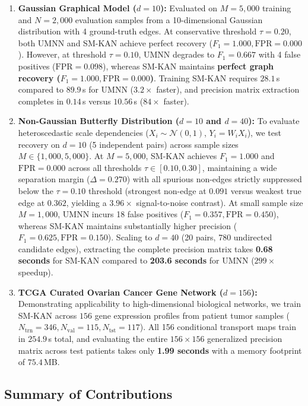 \documentclass[11pt,a4paper]{article}
\theoremstyle{plain}
\theoremstyle{definition}
\theoremstyle{remark}
\begin{document}
\begin{enumerate}
    \item \textbf{Gaussian Graphical Model ($d=10$):} Evaluated on $M=5{,}000$ training and $N=2{,}000$ evaluation samples from a 10-dimensional Gaussian distribution with 4 ground-truth edges. At conservative threshold $\tau = 0.20$, both UMNN and SM-KAN achieve perfect recovery ($F_1 = 1.000, \text{FPR} = 0.000$). However, at threshold $\tau = 0.10$, UMNN degrades to $F_1 = 0.667$ with 4 false positives ($\text{FPR} = 0.098$), whereas SM-KAN maintains \textbf{perfect graph recovery ($F_1 = 1.000, \text{FPR} = 0.000$)}. Training SM-KAN requires $28.1$\,s compared to $89.9$\,s for UMNN ($3.2\times$ faster), and precision matrix extraction completes in $0.14$\,s versus $10.56$\,s ($84\times$ faster).

    \item \textbf{Non-Gaussian Butterfly Distribution ($d=10$ and $d=40$):} To evaluate heteroscedastic scale dependencies ($X_i \sim \mathcal{N}(0, 1)$, $Y_i = W_i X_i$), we test recovery on $d=10$ (5 independent pairs) across sample sizes $M \in \{1{,}000, 5{,}000\}$. At $M=5{,}000$, SM-KAN achieves $F_1 = 1.000$ and $\text{FPR} = 0.000$ across all thresholds $\tau \in [0.10, 0.30]$, maintaining a wide separation margin ($\Delta = 0.270$) with all spurious non-edges strictly suppressed below the $\tau = 0.10$ threshold (strongest non-edge at $0.091$ versus weakest true edge at $0.362$, yielding a $3.96\times$ signal-to-noise contrast). At small sample size $M=1{,}000$, UMNN incurs 18 false positives ($F_1 = 0.357, \text{FPR} = 0.450$), whereas SM-KAN maintains substantially higher precision ($F_1 = 0.625, \text{FPR} = 0.150$). Scaling to $d=40$ (20 pairs, 780 undirected candidate edges), extracting the complete precision matrix takes \textbf{0.68 seconds} for SM-KAN compared to \textbf{203.6 seconds} for UMNN ($299\times$ speedup).
    \item \textbf{TCGA Curated Ovarian Cancer Gene Network ($d=156$):} Demonstrating applicability to high-dimensional biological networks, we train SM-KAN across $156$ gene expression profiles from patient tumor samples ($N_{\text{trn}}=346, N_{\text{val}}=115, N_{\text{tst}}=117$). All 156 conditional transport maps train in $254.9$\,s total, and evaluating the entire $156 \times 156$ generalized precision matrix across test patients takes only \textbf{1.99 seconds} with a memory footprint of $75.4$\,MB.
\end{enumerate}

\subsection{Summary of Contributions}
\label{subsec:summary_conclusions}
\end{document}
